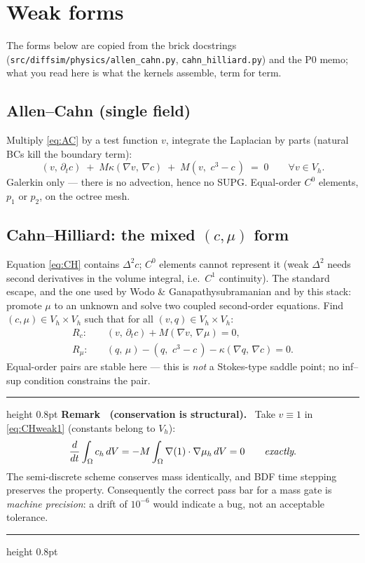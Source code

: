 \documentclass[11pt]{article}
\newcounter{remark}
\newenvironment{remark}[1]{%
  \refstepcounter{remark}\par\medskip
  \noindent\begin{minipage}{\linewidth}
  \hrule height 0.8pt \smallskip
  \textbf{Remark \theremark\ (#1).}\ }{%
  \smallskip\hrule height 0.8pt \end{minipage}\par\medskip}
\newcommand{\ip}[2]{\left(#1,\,#2\right)}
\begin{document}
\section{Weak forms}

The forms below are copied from the brick docstrings
(\texttt{src/diffsim/physics/allen\_cahn.py},
\texttt{cahn\_hilliard.py}) and the P0 memo; what you read here is what
the kernels assemble, term for term.

\subsection{Allen--Cahn (single field)}

Multiply \eqref{eq:AC} by a test function $v$, integrate the Laplacian
by parts (natural BCs kill the boundary term):
\begin{equation}
  \ip{v}{\partial_t c}
  \;+\; M\kappa \ip{\nabla v}{\nabla c}
  \;+\; M \ip{v}{\,c^3 - c\,}
  \;=\; 0
  \qquad \forall v \in V_h .
  \label{eq:ACweak}
\end{equation}
Galerkin only --- there is no advection, hence no SUPG. Equal-order
$C^0$ elements, $p_1$ or $p_2$, on the octree mesh.

\subsection{Cahn--Hilliard: the mixed $(c,\mu)$ form}

Equation \eqref{eq:CH} contains $\Delta^2 c$; $C^0$ elements cannot
represent it (weak $\Delta^2$ needs second derivatives in the volume
integral, i.e.\ $C^1$ continuity). The standard escape, and the one
used by Wodo \& Ganapathysubramanian \cite{wodo2011} and by this stack:
promote $\mu$ to an unknown and solve two coupled second-order
equations. Find $(c,\mu) \in V_h \times V_h$ such that for all
$(v,q) \in V_h \times V_h$:
\begin{align}
  R_c:\quad & \ip{v}{\partial_t c} + M \ip{\nabla v}{\nabla \mu} = 0,
  \label{eq:CHweak1}\\
  R_\mu:\quad & \ip{q}{\mu} - \ip{q}{\,c^3 - c\,}
  - \kappa \ip{\nabla q}{\nabla c} = 0 .
  \label{eq:CHweak2}
\end{align}
Equal-order pairs are stable here --- this is \emph{not} a Stokes-type
saddle point; no inf--sup condition constrains the pair.

\begin{remark}{conservation is structural}
Take $v \equiv 1$ in \eqref{eq:CHweak1} (constants belong to $V_h$):
\begin{equation}
  \frac{d}{dt}\int_\Omega c_h \, dV
  = -M \int_\Omega \nabla(1)\cdot\nabla\mu_h \, dV = 0
  \qquad\text{\emph{exactly}.}
\end{equation}
The semi-discrete scheme conserves mass identically, and BDF time
stepping preserves the property. Consequently the correct pass bar for
a mass gate is \emph{machine precision}: a drift of $10^{-6}$ would
indicate a bug, not an acceptable tolerance.
\end{remark}
\end{document}
